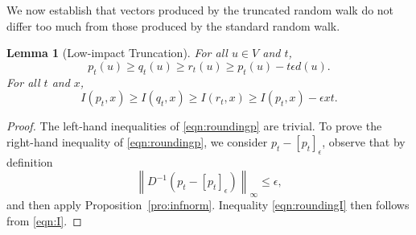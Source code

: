 \documentclass[11pt]{article}
\newtheorem{lemma}[theorem]{Lemma}
\def\round#1{\left[#1 \right]_{\epsilon }}
\def\norm#1{\left\| #1 \right\|}
\begin{document}
We now establish that vectors produced by the
  truncated random walk do not differ too much from those
  produced by the standard random walk.
\begin{lemma}[Low-impact Truncation]\label{lem:rounding}
For all $u \in V$ and $t$,
\begin{equation}\label{eqn:roundingp}
  p_{t} (u) \geq q_{t} (u) \geq   r_{t} (u) \geq p_{t} (u) -  t \epsilon d (u).
\end{equation}
For all $t$ and $x$,
\begin{equation}\label{eqn:roundingI}
I (p_{t},x) \geq I (q_{t}, x) \geq  I (r_{t}, x) \geq I (p_{t}, x) -  \epsilon x t.
\end{equation}
\end{lemma}
\begin{proof}
The left-hand inequalities of \eqref{eqn:roundingp} are trivial.
To prove the right-hand inequality of \eqref{eqn:roundingp}, we consider
  $p_{t} - \round{p_{t}}$, observe that by definition
\[
  \norm{D^{-1} \left(p_{t} - \round{p_{t}} \right) }_{\infty }
  \leq \epsilon,
\]
and then apply Proposition~\ref{pro:infnorm}.
Inequality \eqref{eqn:roundingI} then
  follows from \eqref{eqn:I}.
\end{proof}
\end{document}
